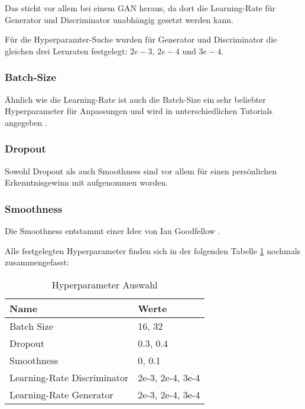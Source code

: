 Das sticht vor allem bei einem GAN heraus, da dort die Learning-Rate für Generator und Discriminator unabhängig gesetzt werden kann.
\newline

Für die Hyperparamter-Suche wurden für Generator und Discriminator die gleichen drei Lernraten festgelegt: \(2e-3\), \(2e-4\) und \(3e-4\).

	
\subsubsection{Batch-Size}
Ähnlich wie die Learning-Rate ist auch die Batch-Size ein sehr beliebter Hyperparameter für Anpassungen und wird in unterschiedlichen Tutorials angegeben \cite{tutorial:tune-batch-size-analyticsvidhya, tutorial:tune-batch-size-machinelearningmastery} .

\subsubsection{Dropout}
Sowohl Dropout als auch Smoothness sind vor allem für einen persönlichen Erkenntnisgewinn mit aufgenommen worden.


\subsubsection{Smoothness}
Die Smoothness entstammt einer Idee von Ian Goodfellow \cite{ian-goodfellow-onesided-label-smoothing}.
\newline

Alle festgelegten Hyperparameter finden sich in der folgenden Tabelle \ref{table:hyperparameter} nochmals zusammengefasst:

\begin{table}[H]
	\centering
	\label{table:hyperparameter}
	\begin{tabular}{l l}
		Name                        & Werte            \\ \hline
		Batch Size                  & 16, 32           \\
		Dropout                     & 0.3, 0.4         \\
		Smoothness                  & 0, 0.1           \\
		Learning-Rate Discriminator & 2e-3, 2e-4, 3e-4 \\
		Learning-Rate Generator     & 2e-3, 2e-4, 3e-4
	\end{tabular}
	\caption{Hyperparameter Auswahl}
\end{table}

